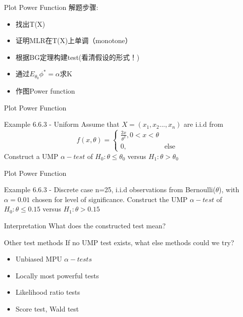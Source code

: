 \documentclass{beamer}
\begin{document}
    \begin{frame}{Plot Power Function}
    解题步骤:
        \begin{itemize}
            \item 找出T(X)
            \item 证明MLR在T(X)上单调（monotone）
            \item 根据BG定理构建test(看清假设的形式！)
            \item 通过$E_{\theta_0}\phi^*=\alpha$求K
            \item 作图Power function
        \end{itemize}
    \end{frame}
    
    \begin{frame}{Plot Power Function}
        \begin{exampleblock}{Example 6.6.3 - Uniform}
            Assume that $X=(x_1,x_2...,x_n)$ are i.i.d from
            \[
                f(x,\theta)= 
                \begin{cases}
                    \frac{2x}{\theta^2}, 0<x<\theta\\
                    0,&\text{else }
                \end{cases}
            \]
            Construct a UMP $\alpha-test$ of $H_0:\theta \leq \theta_0$ versus $H_1:\theta > \theta_0$
        \end{exampleblock}
    \end{frame}

    \begin{frame}{Plot Power Function}
        \begin{exampleblock}{Example 6.6.3 - Discrete case}
        n=25, i.i.d observations from Bernoulli($\theta$), with $\alpha=0.01$ chosen for level of significance. Construct the UMP $\alpha-test$ of $H_0:\theta \leq 0.15$ versus $H_1:\theta > 0.15$
        \end{exampleblock}
        
        \begin{block}{Interpretation}
            What does the constructed test mean?
        \end{block}
    \end{frame}
    
    \begin{frame}{Other test methods}
        If no UMP test exists, what else methods could we try?
        \begin{itemize}
            \item Unbiased MPU $\alpha-tests$
            \item Locally most powerful tests
            \item Likelihood ratio tests
            \item Score test, Wald test
        \end{itemize}
    \end{frame}
        
\end{document}
